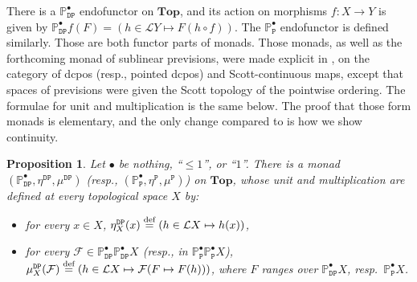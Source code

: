 \documentclass[preprint,12pt]{elsarticle}
\newcommand\eqdef{\mathrel{\buildrel \text{def}\over=}}
\newcommand\Lform{\mathcal L}
\newcommand\Pred{\mathbb{P}}
\newcommand\Demon{{\mathtt{D}}}
\newcommand\Nature{{\mathtt{P}}}
\newcommand\DN{{\Demon\Nature}}
\newcommand\Topcat{\mathbf{Top}}
\newtheorem{proposition}[theorem]{Proposition}
\begin{document}
There is a $\Pred_\DN^\bullet$ endofunctor on $\Topcat$, and its
action on morphisms $f \colon X \to Y$ is given by
$\Pred_\DN^\bullet f (F) = (h \in \Lform Y \mapsto F (h \circ f))$.
The $\Pred_\Nature^\bullet$ endofunctor is defined similarly.  Those
are both functor parts of monads.  Those monads, as well as the
forthcoming monad of sublinear previsions, were made explicit in
\cite[Proposition~2]{Gou-csl07}, on the category of dcpos (resp.,
pointed dcpos) and Scott-continuous maps, except that spaces of
previsions were given the Scott topology of the pointwise ordering.
The formulae for unit and multiplication is the same below.  The proof
that those form monads is elementary, and the only change compared to
\cite{Gou-csl07} is how we show continuity.
\begin{proposition}
  \label{prop:DN:monad}
  Let $\bullet$ be nothing, ``$\leq 1$'', or ``$1$''.  There is a
  monad
  $(\Pred_\DN^\bullet, \allowbreak \eta^\DN, \allowbreak \mu^\DN)$
  (resp.,
  $(\Pred_\Nature^\bullet, \allowbreak \eta^\Nature, \allowbreak
  \mu^\Nature)$) on $\Topcat$, whose unit and multiplication are
  defined at every topological space $X$ by:
  \begin{itemize}
  \item for every $x \in X$, $\eta^\DN_X (x) \eqdef (h \in \Lform X
    \mapsto h (x))$,
  \item for every
    $\mathcal F \in \Pred_\DN^\bullet {\Pred_\DN^\bullet X}$ (resp.,
    in $\Pred_\Nature^\bullet {\Pred_\Nature^\bullet X}$),
    $\mu^\DN_X (\mathcal F) \eqdef (h \in \Lform X \mapsto \mathcal F
    (F \mapsto F (h)))$, where $F$ ranges over $\Pred_\DN^\bullet X$,
    resp.\ $\Pred_\Nature^\bullet X$.
  \end{itemize}
\end{proposition}
\end{document}
